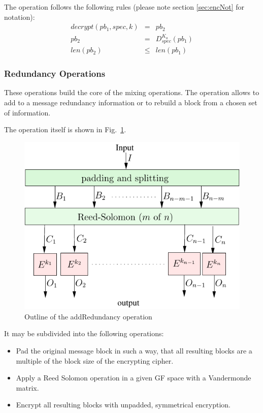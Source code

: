 \documentclass[10pt,journal,compsoc]{IEEEtran}
\let\MYoriglatexcaption\caption
\renewcommand{\caption}[2][\relax]{\MYoriglatexcaption[#2]{#2}}
\begin{document}
The operation follows the following rules (please note section \ref{sec:encNot} for notation):
\begin{eqnarray}
decrypt(pb_1, spec, k) & = & pb_2 \\
pb_2 & = & D_{spec}^{K_a}\left( pb_1 \right)\\
len(pb_2) & \leq & len(pb_1)
\end{eqnarray}

\subsubsection{Redundancy Operations}
These operations build the core of the mixing operations. The operation allows to add to a message redundancy information or to rebuild a block from a chosen set of information. 

The operation itself is shown in Fig.~\ref{fig:addRedundancyOperation}. 
\begin{figure}[ht]\centering
	\includegraphics[width=0.8\columnwidth]{../../inc/addRedundancyOp}
	\caption{Outline of the addRedundancy operation}
	\label{fig:addRedundancyOperation}
\end{figure}

It may be subdivided into the following operations:
\begin{itemize}
	\item Pad the original message block in such a way, that all resulting blocks are a multiple of the block size of the encrypting cipher.
	\item Apply a Reed Solomon operation in a given GF space with a Vandermonde matrix.
	\item Encrypt all resulting blocks with unpadded, symmetrical encryption.
\end{itemize}
\end{document}
